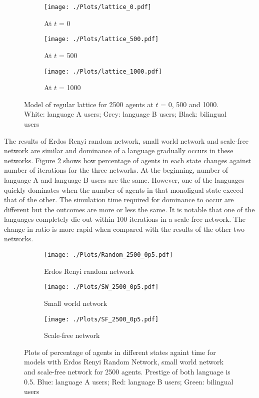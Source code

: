 \documentclass[a4paper, 11pt]{article}
\begin{document}
\begin{figure}
  \begin{subfigure}[b]{0.32\textwidth}
    \texttt{[image: ./Plots/lattice\_0.pdf]}
    \caption{At $t$ = 0}
  \end{subfigure}
  \begin{subfigure}[b]{0.32\textwidth}
    \texttt{[image: ./Plots/lattice\_500.pdf]}
    \caption{At $t$ = 500}
  \end{subfigure}
  \begin{subfigure}[b]{0.32\textwidth}
    \texttt{[image: ./Plots/lattice\_1000.pdf]}
    \caption{At $t$ = 1000}
  \end{subfigure}
\caption{Model of regular lattice for 2500 agents at $t$ = 0, 500 and 1000. White: language A users; Grey: language B users; Black: bilingual users}
\label{regular_lattice}
\end{figure}



The results of Erdos Renyi random network, small world network and scale-free network are similar and dominance of a language gradually occurs in these networks. Figure \ref{ohne_comm_ep} shows how percentage of agents in each state changes against number of iterations for the three networks. At the beginning, number of language A and language B users are the same. However, one of the languages quickly dominates when the number of agents in that monoligual state exceed that of the other. The simulation time required for dominance to occur are different but the outcomes are more or less the same. It is notable that one of the languages completely die out within 100 iterations in a scale-free network. The change in ratio is more rapid when compared with the results of the other two networks. 


\begin{figure}
  \begin{subfigure}[b]{0.32\textwidth}
    \texttt{[image: ./Plots/Random\_2500\_0p5.pdf]}
    \caption{Erdos Renyi random network}
  \end{subfigure}
  \begin{subfigure}[b]{0.32\textwidth}
    \texttt{[image: ./Plots/SW\_2500\_0p5.pdf]}
    \caption{Small world network}
  \end{subfigure}
  \begin{subfigure}[b]{0.32\textwidth}
    \texttt{[image: ./Plots/SF\_2500\_0p5.pdf]}
    \caption{Scale-free network}
  \end{subfigure}
\caption{Plots of percentage of agents in different states againt time for models with Erdos Renyi Random Network, small world network and scale-free network for 2500 agents. Prestige of both language is 0.5. Blue: language A users; Red: language B users; Green: bilingual users}
\label{ohne_comm_ep}
\end{figure}
\end{document}
